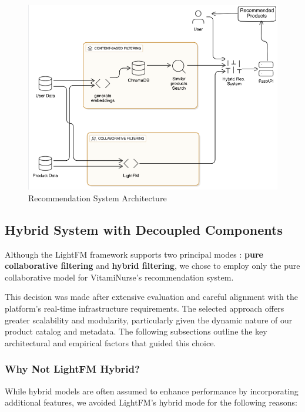 \begin{center}
\begin{figure}[H]
    \includegraphics[scale=0.55]{images/RS_Arch.png}
    \caption{Recommendation System Architecture } 
    \label{fig:Recommendation_Sequence_Diagram }
\end{figure}
\end{center}
\subsection{Hybrid System with Decoupled Components}

Although the LightFM framework supports two principal modes : \textbf{pure collaborative filtering} and \textbf{hybrid filtering}, we chose to employ only the pure collaborative model for VitamiNurse’s recommendation system.

This decision was made after extensive evaluation and careful alignment with the platform’s real-time infrastructure requirements. The selected approach offers greater scalability and modularity, particularly given the dynamic nature of our product catalog and metadata. The following subsections outline the key architectural and empirical factors that guided this choice.


\subsubsection{Why Not LightFM Hybrid?}

While hybrid models are often assumed to enhance performance by incorporating additional features, we avoided LightFM's hybrid mode for the following reasons:

